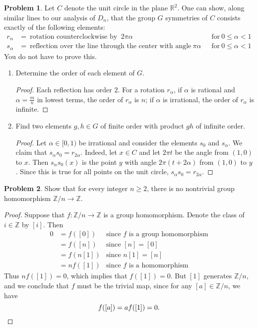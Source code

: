 \documentclass[11pt]{article}
\newcommand{\Z}{\mathbb{Z}}
\newcommand{\R}{\mathbb{R}}
\theoremstyle{definition}
\newtheorem{problem}{Problem}
\begin{document}
\begin{problem}
	Let $C$ denote the unit circle in the plane $\R^2$. One can show, along similar lines to our analysis of $D_n$, that the group $G$ symmetries of $C$ consists exactly of the following elements:
	\[\begin{aligned}  r_\alpha &= \ \text{rotation counterclockwise by } \ 2 \pi \alpha \quad &\text{for} \ 0\leq \alpha <1 \\
s_\alpha &= \ \text{reflection over the line through the center with angle} \ \pi \alpha \qquad &\text{for} \ 0\leq \alpha <1\end{aligned}\]
You do not have to prove this. 
\begin{enumerate}[(4.1)]
\item Determine the order of each element of $G$.
\begin{proof}
Each reflection has order $2$. For a rotation $r_\alpha$, if $\alpha$ is rational and $\alpha=\frac{m}{n}$ in lowest terms, the order of $r_\alpha$ is $n$; if $\alpha$ is irrational, the order of $r_\alpha$ is infinite.
\end{proof}
\item Find two elements $g,h\in G$ of finite order with product $gh$ of infinite order.
\begin{proof} Let $\alpha \in [0,1)$ be irrational and consider the elements $s_0$ and $s_\alpha$. We claim that $s_\alpha s_0= r_{2\alpha}$. Indeed, let $x\in C$ and let $2 \pi t$ be the angle from $(1,0)$ to $x$. Then $s_\alpha s_0 (x)$ is the point $y$ with angle $2 \pi (t+2 \alpha)$ from $(1,0)$ to $y$. Since this is true for all points on the unit circle, $s_\alpha s_0 = r_{2\alpha}$.
\end{proof}
\end{enumerate}
\end{problem}



\begin{problem}
Show that for every integer $n \geqslant 2$, there is no nontrivial group homomorphism $\Z/n \longrightarrow \Z$.
\end{problem}



\begin{proof}
Suppose that $f\!: \Z/n \longrightarrow \Z$ is a group homomorphism. Denote the class of $i \in \Z$ by $[i]$. Then
$$\begin{aligned}
0 & = f([0]) & \textrm{since $f$ is a group homomorphism}\\
& = f([n]) & \textrm{since } [n] = [0]\\
& = f(n[1]) & \textrm{since } n[1] = [n] \\
& = nf([1])	& \textrm{since $f$ is a homomorphism}
\end{aligned}
$$
Thus $nf([1]) = 0$, which implies that $f([1]) = 0$. But $[1]$ generates $\Z/n$, and we conclude that $f$ must be the trivial map, since for any $[a] \in \Z/n$, we have
$$f([a]) = af([1]) = 0.\qedhere$$
\end{proof}
\end{document}
